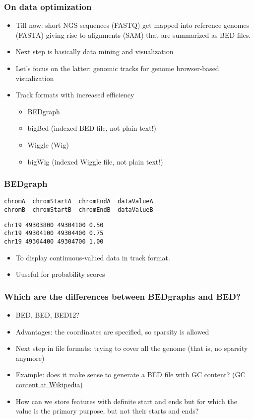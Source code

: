 \documentclass{beamer}
\begin{document}
\begin{frame}
  \frametitle{On data optimization}
  \begin{itemize}
  \item Till now: short NGS sequences (FASTQ) get mapped into reference genomes (FASTA) giving rise to alignments (SAM) that are summarized as BED files.
  \item Next step is basically data mining and visualization
  \item Let's focus on the latter: genomic tracks for genome browser-based visualization
  \item Track formats with increased efficiency
    \begin{itemize}
    \item BEDgraph
    \item bigBed (indexed BED file, not plain text!)
    \item Wiggle (Wig)
    \item bigWig (indexed Wiggle file, not plain text!)
    \end{itemize}
  \end{itemize}
\end{frame}


\begin{frame}[fragile]
\frametitle{BEDgraph}
\begin{verbatim}
chromA  chromStartA  chromEndA  dataValueA
chromB  chromStartB  chromEndB  dataValueB
\end{verbatim}
\begin{verbatim}
chr19 49303800 49304100 0.50
chr19 49304100 49304400 0.75
chr19 49304400 49304700 1.00
\end{verbatim}
\begin{itemize}
    \item To display continuous-valued data in track format.
    \item Uuseful for probability scores
    \end{itemize}
\end{frame}

\begin{frame}
  \frametitle{Which are the differences between BEDgraphs and BED?}
  \begin{itemize}
  \item BED, BED, BED12?
  \item Advantages: the coordinates are specified, so sparsity is allowed
  \item Next step in file formats: trying to cover all the genome (that is, no sparsity anymore)
  \item Example: does it make sense to generate a BED file with GC content? (\href{https://en.wikipedia.org/wiki/GC-content}{GC content at Wikipedia})
  \item How can we store features with definite start and ends but for which the value is the primary purpose, but not their starts and ends?
  \end{itemize}
\end{frame}
\end{document}
